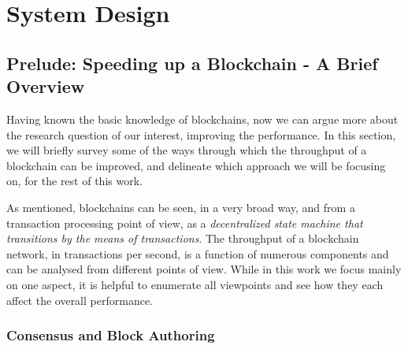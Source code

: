 \chapter{System Design} \label{chap:design}



\section{Prelude: Speeding up a Blockchain - A Brief Overview} \label{chap_design:sec:ways_to_speedup}

Having known the basic knowledge of blockchains, now we can argue more about the research question
of our interest, improving the performance. In this section, we will briefly survey some of the ways
through which the throughput of a blockchain can be improved, and delineate which approach we will
be focusing on, for the rest of this work.

As mentioned, blockchains can be seen, in a very broad way, and from a transaction processing point
of view, as a \textit{decentralized state machine that transitions by the means of transactions}.
The throughput of a blockchain network, in transactions per second, is a function of numerous
components and can be analysed from different points of view. While in this work we focus mainly on
one aspect, it is helpful to enumerate all viewpoints and see how they each affect the overall
performance.

\subsection{Consensus and Block Authoring}

